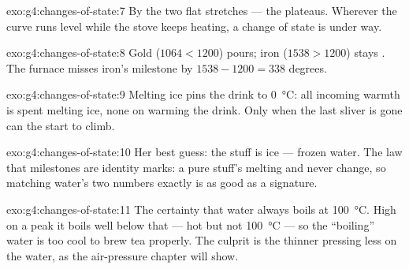 \begin{solution}{exo:g4:changes-of-state:7}
By the two flat stretches --- the plateaus. Wherever the curve runs
level while the stove keeps heating, a change of state is under
way.
\end{solution}

\begin{solution}{exo:g4:changes-of-state:8}
Gold ($1064 < 1200$) pours; iron ($1538 > 1200$) stays . The
furnace misses iron's milestone by $1538 - 1200 = 338$ degrees.
\end{solution}

\begin{solution}{exo:g4:changes-of-state:9}
Melting ice pins the drink to \qty{0}{\celsius}: all incoming warmth
is spent melting ice, none on warming the drink. Only when the last
sliver is gone can the  start to climb.
\end{solution}

\begin{solution}{exo:g4:changes-of-state:10}
Her best guess: the stuff is ice --- frozen water. The law that
milestones are identity marks: a pure stuff's melting and  never change, so matching water's two numbers exactly is as
good as a signature.
\end{solution}

\begin{solution}{exo:g4:changes-of-state:11}
The certainty that water always boils at \qty{100}{\celsius}. High
on a peak it boils well below that --- hot but not
\qty{100}{\celsius} --- so the ``boiling'' water is too cool to brew
tea properly. The culprit is the thinner  pressing less on the
water, as the air-pressure chapter will show.
\end{solution}

